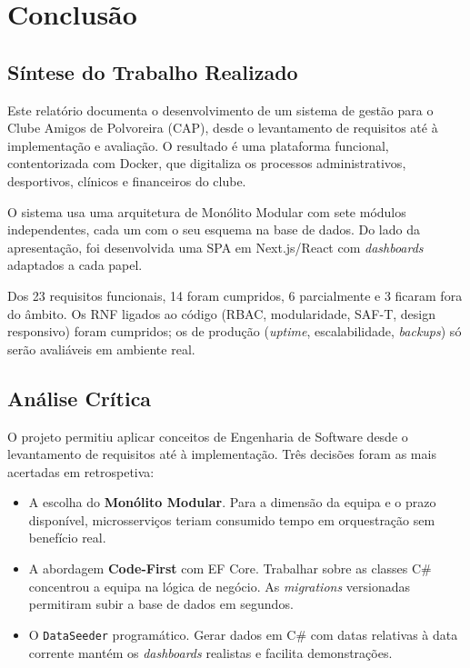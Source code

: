 \chapter{Conclusão}\label{chap:conclusao}

\section{Síntese do Trabalho Realizado}

Este relatório documenta o desenvolvimento de um sistema de gestão para o Clube Amigos de Polvoreira (CAP), desde o levantamento de requisitos até à implementação e avaliação. O resultado é uma plataforma funcional, contentorizada com Docker, que digitaliza os processos administrativos, desportivos, clínicos e financeiros do clube.

O sistema usa uma arquitetura de Monólito Modular com sete módulos independentes, cada um com o seu esquema na base de dados. Do lado da apresentação, foi desenvolvida uma SPA em Next.js/React com \textit{dashboards} adaptados a cada papel.

Dos 23 requisitos funcionais, 14 foram cumpridos, 6 parcialmente e 3 ficaram fora do âmbito. Os RNF ligados ao código (RBAC, modularidade, SAF-T, design responsivo) foram cumpridos; os de produção (\textit{uptime}, escalabilidade, \textit{backups}) só serão avaliáveis em ambiente real.

\section{Análise Crítica}

O projeto permitiu aplicar conceitos de Engenharia de Software desde o levantamento de requisitos até à implementação. Três decisões foram as mais acertadas em retrospetiva:

\begin{itemize}
    \item A escolha do \textbf{Monólito Modular}. Para a dimensão da equipa e o prazo disponível, microsserviços teriam consumido tempo em orquestração sem benefício real.
    \item A abordagem \textbf{Code-First} com EF Core. Trabalhar sobre as classes C\# concentrou a equipa na lógica de negócio. As \textit{migrations} versionadas permitiram subir a base de dados em segundos.
    \item O \texttt{DataSeeder} programático. Gerar dados em C\# com datas relativas à data corrente mantém os \textit{dashboards} realistas e facilita demonstrações.
\end{itemize}

